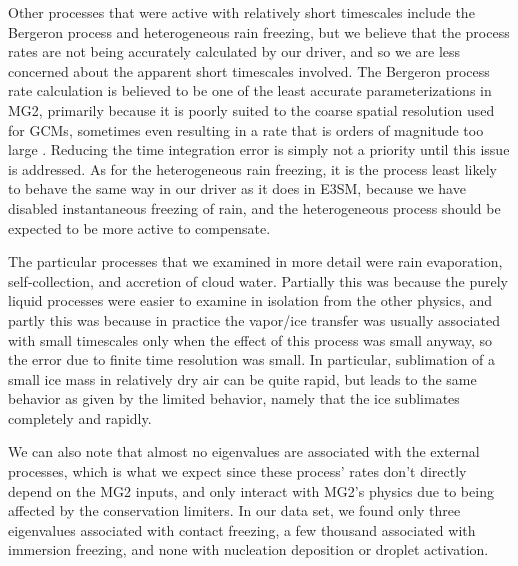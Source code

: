 \documentclass [11pt, proquest] {uwthesis}[2020/02/24]
\begin{document}
Other processes that were active with relatively short timescales include the Bergeron process and heterogeneous rain freezing, but we believe that the process rates are not being accurately calculated by our driver, and so we are less concerned about the apparent short timescales involved. The Bergeron process rate calculation is believed to be one of the least accurate parameterizations in MG2, primarily because it is poorly suited to the coarse spatial resolution used for GCMs, sometimes even resulting in a rate that is orders of magnitude too large \parencite{Tan2016,Zhang2019}. Reducing the time integration error is simply not a priority until this issue is addressed. As for the heterogeneous rain freezing, it is the process least likely to behave the same way in our driver as it does in E3SM, because we have disabled instantaneous freezing of rain, and the heterogeneous process should be expected to be more active to compensate.

The particular processes that we examined in more detail were rain evaporation, self-collection, and accretion of cloud water.  Partially this was because the purely liquid processes were easier to examine in isolation from the other physics, and partly this was because in practice the vapor/ice transfer was usually associated with small timescales only when the effect of this process was small anyway, so the error due to finite time resolution was small. In particular, sublimation of a small ice mass in relatively dry air can be quite rapid, but leads to the same behavior as given by the limited behavior, namely that the ice sublimates completely and rapidly.

We can also note that almost no eigenvalues are associated with the external processes, which is what we expect since these process' rates don't directly depend on the MG2 inputs, and only interact with MG2's physics due to being affected by the conservation limiters. In our data set, we found only three eigenvalues associated with contact freezing, a few thousand associated with immersion freezing, and none with nucleation deposition or droplet activation.
\end{document}

